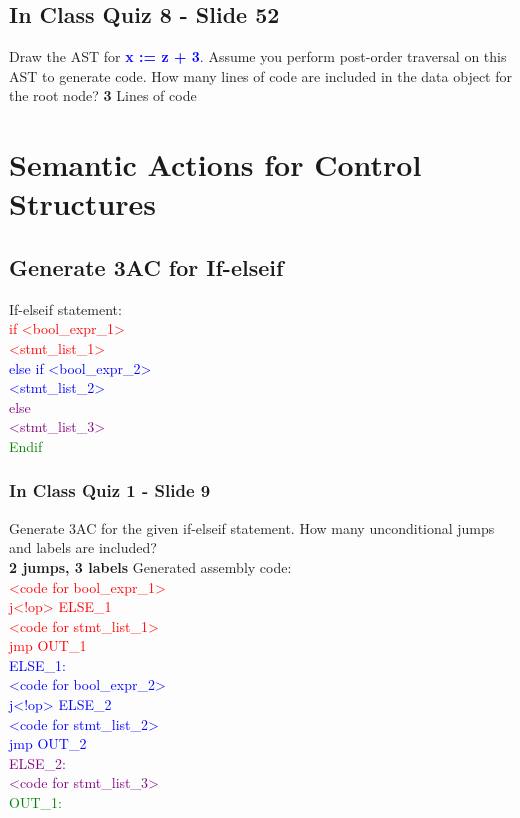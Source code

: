 \documentclass{report}
\newcommand{\textb}[1]{\textcolor{blue}{#1}}
\newcommand{\textg}[1]{\textcolor{green}{#1}}
\newcommand{\textp}[1]{\textcolor{purple}{#1}}
\newcommand{\textr}[1]{\textcolor{red}{#1}}
\newcommand{\textbfb}[1]{\textbf{\textb{#1}}}
\newlength\tindent
\renewcommand{\indent}{\hspace*{\tindent}}
\begin{document}
\section{In Class Quiz 8 - Slide 52}
Draw the AST for \textbfb{x := z + 3}. Assume you perform post-order traversal
on this AST to generate code. How many lines of code are included in
the data object for the root node? \textbf{3} Lines of code


\chapter{Semantic Actions for Control Structures}
\section{Generate 3AC for If-elseif}
\vspace{-1em}
\begin{multicols}{2}
If-elseif statement: \\
\textr{if <bool\_expr\_1>} \\
\indent \textr{<stmt\_list\_1>} \\
\textb{else if <bool\_expr\_2>} \\
\indent \textb{<stmt\_list\_2>} \\
\textp{else} \\
\indent \textp{<stmt\_list\_3>} \\
\textg{Endif}


\subsection{In Class Quiz 1 - Slide 9}
\vspace{.5em}
Generate 3AC for the given if-elseif statement.
How many unconditional jumps and labels are included? \\
\textbf{2 jumps, 3 labels}
  \vfill\columnbreak
Generated assembly code: \\
\indent \textr{<code for bool\_expr\_1>} \\
\indent \textr{j<!op> ELSE\_1} \\
\indent \textr{<code for stmt\_list\_1>} \\
\indent \textr{jmp OUT\_1} \\
\textb{ELSE\_1:} \\
\indent \textb{<code for bool\_expr\_2>} \\
\indent \textb{j<!op> ELSE\_2} \\
\indent \textb{<code for stmt\_list\_2>} \\
\indent \textb{jmp OUT\_2} \\
\textp{ELSE\_2:} \\
\indent \textp{<code for stmt\_list\_3>} \\
\textg{OUT\_1:}
\end{multicols}
\end{document}
